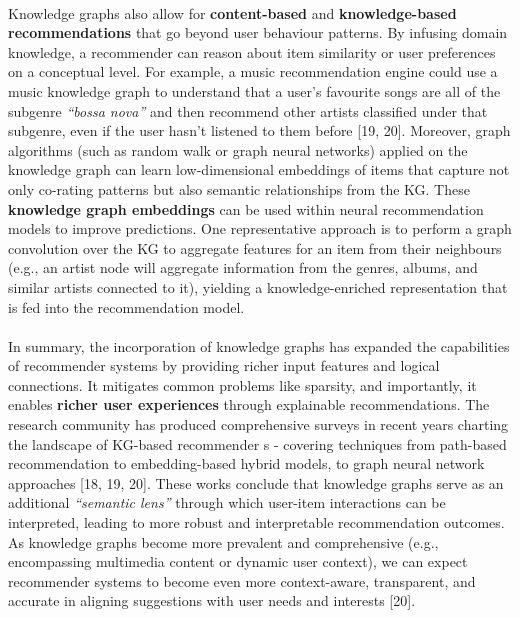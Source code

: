         \paragraph{} Knowledge graphs also allow for \textbf{content-based} and \textbf{knowledge-based recommendations} that go beyond user behaviour patterns. By infusing domain knowledge, a recommender can reason about item similarity or user preferences on a conceptual level. For example, a music recommendation engine could use a music knowledge graph to understand that a user’s favourite songs are all of the subgenre \textit{“bossa nova”} and then recommend other artists classified under that subgenre, even if the user hasn’t listened to them before [19, 20]. Moreover, graph algorithms (such as random walk or graph neural networks) applied on the knowledge graph can learn low-dimensional embeddings of items that capture not only co-rating patterns but also semantic relationships from the KG. These \textbf{knowledge graph embeddings} can be used within neural recommendation models to improve predictions. One representative approach is to perform a graph convolution over the KG to aggregate features for an item from their neighbours (e.g., an artist node will aggregate information from the genres, albums, and similar artists connected to it), yielding a knowledge-enriched representation that is fed into the recommendation model.

        \paragraph{} In summary, the incorporation of knowledge graphs has expanded the capabilities of recommender systems by providing richer input features and logical connections. It mitigates common problems like sparsity, and importantly, it enables \textbf{richer user experiences} through explainable recommendations. The research community has produced comprehensive surveys in recent years charting the landscape of KG-based recommender s - covering techniques from path-based recommendation to embedding-based hybrid models, to graph neural network approaches [18, 19, 20]. These works conclude that knowledge graphs serve as an additional \textit{“semantic lens”} through which user-item interactions can be interpreted, leading to more robust and interpretable recommendation outcomes. As knowledge graphs become more prevalent and comprehensive (e.g., encompassing multimedia content or dynamic user context), we can expect recommender systems to become even more context-aware, transparent, and accurate in aligning suggestions with user needs and interests [20].

